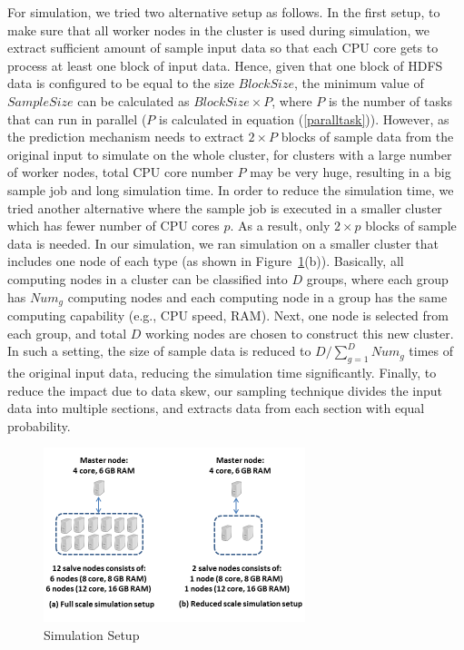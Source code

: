 \noindent
For simulation, we tried two alternative setup as follows. 
In the first setup, to make sure that all worker nodes in the cluster is used during simulation, we extract sufficient amount of sample input data so that each CPU core gets to process at least one block of input data. Hence, given that one block of HDFS data is configured to be equal to the size $BlockSize$, the minimum value of $SampleSize$ can be calculated as $BlockSize \times P$, where $P$ is the number of tasks that can run in parallel ($P$ is calculated in equation (\ref{paralltask})). 
\noindent
However, as the prediction mechanism needs to extract $2 \times P$ blocks of sample data from the original input to simulate on the whole cluster, for clusters with a large number of worker nodes, total CPU core number $P$ may be very huge, resulting in a big sample job and long simulation time. In order to reduce the simulation time, we tried another alternative where the sample job is executed in a smaller cluster which has fewer number of CPU cores $p$. As a result, only $2 \times p$ blocks of sample data is needed. In our simulation, we ran simulation on a smaller cluster that includes one node of each type (as shown in Figure~\ref{fig:cluster}(b)). Basically, all computing nodes in a cluster can be classified into $D$ groups, where each group has $Num_g$ computing nodes and each computing node in a group has the same computing capability (e.g., CPU speed, RAM). Next, one node is selected from each group, and total $D$ working nodes are chosen to construct this new cluster. In such a setting, the size of sample data is reduced to $D / \sum_{g=1}^{D} Num_g$ times of the original input data, reducing the simulation time significantly. 
Finally, to reduce the impact due to data skew, our sampling technique divides the input data into multiple sections, and extracts data from each section with equal probability.
\begin{figure}[!t]
\centering
\includegraphics[width=3.0in]{figures/cluster.png}
\caption{Simulation Setup}
\label{fig:cluster}
\end{figure}

